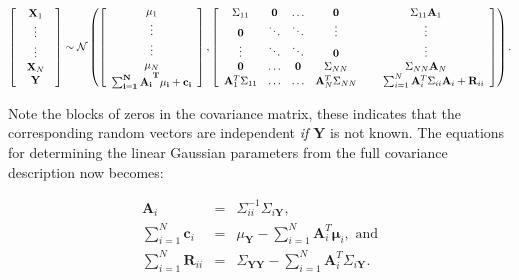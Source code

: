 \begin{equation}
\left[\begin{array}{c}
\begin{array}{c}
\mathbf{X}_{1}\\
\vdots\\
\vdots\\
\mathbf{X}_{N}\\
\mathbf{Y}
\end{array}\end{array}\right]\sim\mathcal{N}\left(\left[\begin{array}{c}
\mathbf{\mu}_{1}\\
\vdots\\
\vdots\\
\mathbf{\mu}_{N}\\
\mathbf{\mathbf{\sum_{i=1}^{N}A_{i}}^{T}\mathbf{\mu_{i}}+\mathbf{c_{i}}}
\end{array}\right],\left[\begin{array}{ccccc}
\Sigma_{11} & \mathbf{0} & \hdots & \mathbf{0} & \Sigma_{11}\mathbf{A}_{1}\\
\mathbf{0} & \ddots & \ddots & \vdots & \vdots\\
\vdots & \ddots & \ddots & \mathbf{0} & \vdots\\
\mathbf{0} & \hdots & \mathbf{0} & \Sigma_{NN} & \Sigma_{NN}\mathbf{A}_{N}\\
\mathbf{A}_{1}^{T}\Sigma_{11} & \hdots & \hdots & \mathbf{A}_{N}^{T}\Sigma_{NN} & \hspace{5mm}\sum_{i=1}^{N}\mathbf{A}_{i}^{T}\Sigma_{ii}\mathbf{A}_{i}+\mathbf{R}_{ii}
\end{array}\right]\right).
\end{equation}


Note the blocks of zeros in the covariance matrix, these indicates
that the corresponding random vectors are independent \emph{if $\mathbf{Y}$}
is not known. The equations for determining the linear Gaussian parameters
from the full covariance description now becomes:

\begin{eqnarray}
\mathbf{A}_{i} & = & \Sigma_{ii}^{-1}\Sigma_{i\mathbf{Y}},\\
\sum_{i=1}^{N}\mathbf{c}_{i} & = & \mu_{\mathbf{Y}}-\sum_{i=1}^{N}\mathbf{A}_{i}^{T}\mathbf{\mu}_{i},\mbox{ and}\\
\sum_{i=1}^{N}\mathbf{R}_{ii} & = & \Sigma_{\mathbf{YY}}-\sum_{i=1}^{N}\mathbf{A}_{i}^{T}\Sigma_{i\mathbf{Y}}.
\end{eqnarray}


